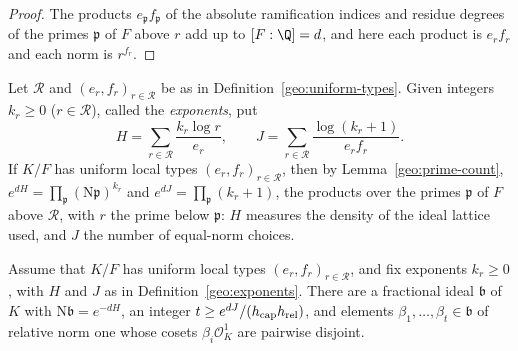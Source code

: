 \begin{proof}
The products $e_{\mathfrak p}f_{\mathfrak p}$ of the absolute ramification
indices and residue degrees of the primes $\mathfrak p$ of $F$ above $r$ add
up to $[F:\Q]=d$, and here each product is $e_rf_r$ and each norm is
$r^{f_r}$.
\end{proof}

\begin{definition}\label{geo:exponents}
Let $\mathcal R$ and $(e_r,f_r)_{r\in\mathcal R}$ be as in
Definition~\ref{geo:uniform-types}. Given integers $k_r\ge0$
($r\in\mathcal R$), called the \emph{exponents}, put
\begin{equation}\label{geo:HJ}
 H=\sum_{r\in\mathcal R}\frac{k_r\log r}{e_r},\qquad
 J=\sum_{r\in\mathcal R}\frac{\log(k_r+1)}{e_rf_r}.
\end{equation}
If $K/F$ has uniform local types $(e_r,f_r)_{r\in\mathcal R}$, then by
Lemma~\ref{geo:prime-count}, $e^{dH}=\prod_{\mathfrak p}(\mathrm N\mathfrak
p)^{k_r}$ and $e^{dJ}=\prod_{\mathfrak p}(k_r+1)$, the products over the
primes $\mathfrak p$ of $F$ above $\mathcal R$, with $r$ the prime below
$\mathfrak p$: $H$ measures the density of the ideal lattice used, and $J$ the
number of equal-norm choices.
\end{definition}

\begin{lemma}\label{geo:selection}
Assume that $K/F$ has uniform local types $(e_r,f_r)_{r\in\mathcal R}$, and
fix exponents $k_r\ge0$, with $H$ and $J$ as in
Definition~\ref{geo:exponents}. There are a
fractional ideal $\mathfrak b$ of $K$ with $\mathrm N\mathfrak b=e^{-dH}$, an integer
$t\ge e^{dJ}/(h_{\rm cap}h_{\rm rel})$, and elements
$\beta_1,\dots,\beta_t\in\mathfrak b$ of relative norm one whose cosets
$\beta_i\mathcal O_K^1$ are pairwise disjoint.
\end{lemma}

